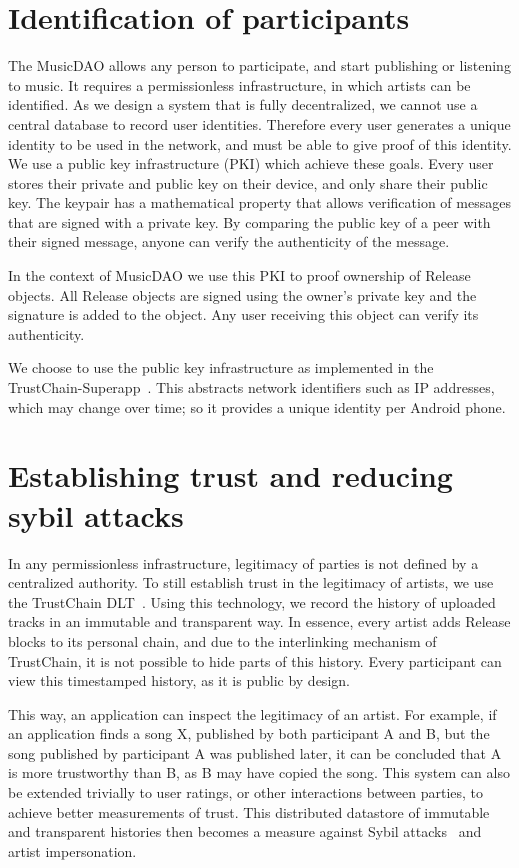 \section{Identification of participants}
\label{sec:pki-design}
The MusicDAO allows any person to participate, and start publishing or listening to music. It requires a permissionless infrastructure, in which artists can be identified. As we design a system that is fully decentralized, we cannot use a central database to record user identities. Therefore every user generates a unique identity to be used in the network, and must be able to give proof of this identity. We use a public key infrastructure (PKI) which achieve these goals. Every user stores their private and public key on their device, and only share their public key. The keypair has a mathematical property that allows verification of messages that are signed with a private key. By comparing the public key of a peer with their signed message, anyone can verify the authenticity of the message.

In the context of MusicDAO we use this PKI to proof ownership of Release objects. All Release objects are signed using the owner's private key and the signature is added to the object. Any user receiving this object can verify its authenticity.

We choose to use the public key infrastructure as implemented in the TrustChain-Superapp~\citep{mattskala2020}. This abstracts network identifiers such as IP addresses, which may change over time; so it provides a unique identity per Android phone.

\section{Establishing trust and reducing sybil attacks}
In any permissionless infrastructure, legitimacy of parties is not defined by a centralized authority. To still establish trust in the legitimacy of artists, we use the TrustChain DLT~\citep{otte2017trustchain}. Using this technology, we record the history of uploaded tracks in an immutable and transparent way. In essence, every artist adds Release blocks to its personal chain, and due to the interlinking mechanism of TrustChain, it is not possible to hide parts of this history. Every participant can view this timestamped history, as it is public by design. 

This way, an application can inspect the legitimacy of an artist. For example, if an application finds a song X, published by both participant A and B, but the song published by participant A was published later, it can be concluded that A is more trustworthy than B, as B may have copied the song. This system can also be extended trivially to user ratings, or other interactions between parties, to achieve better measurements of trust. This distributed datastore of immutable and transparent histories then becomes a measure against Sybil attacks~\citep{douceur2002sybil} and artist impersonation.

